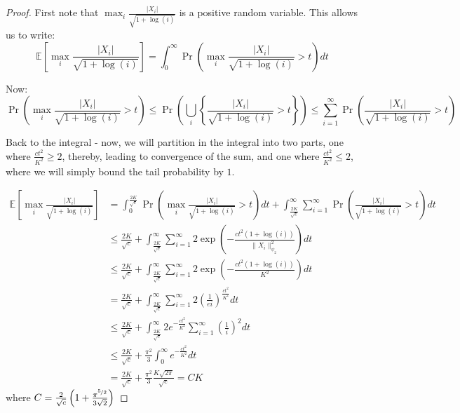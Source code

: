 \documentclass{article}
\theoremstyle{remark}
\newcommand{\Exp}{\mathbb{E}}
\begin{document}
\begin{proof}
First note that \(\max_{i} \frac{|X_{i}|}{\sqrt{1 + \log(i)}}\) is a positive random variable. This allows us to write:
\begin{equation*}
\Exp\left[\max_{i} \frac{|X_{i}|}{\sqrt{1 + \log(i)}}\right] = \int_{0}^{\infty} \Pr\left(\max_{i} \frac{|X_{i}|}{\sqrt{1 + \log(i)}} > t\right) dt
\end{equation*}

Now:
\begin{equation*}
\Pr\left(\max_{i} \frac{|X_{i}|}{\sqrt{1 + \log(i)}} > t\right) \leq \Pr\left(\bigcup_{i} \left\{\frac{|X_{i}|}{\sqrt{1 + \log(i)}} > t\right\}\right) \leq \sum_{i=1}^{\infty} \Pr\left(\frac{|X_{i}|}{\sqrt{1 + \log(i)}} > t\right)
\end{equation*}

Back to the integral - now, we will partition in the integral into two parts, one where \(\frac{ct^{2}}{K^{2}} \geq 2\), thereby, leading to convergence of the sum, and one where \(\frac{ct^{2}}{K^{2}} \leq 2\), where we will simply bound the tail probability by \(1\).

\begin{align*}
\Exp\left[\max_{i} \frac{|X_{i}|}{\sqrt{1 + \log(i)}}\right] &= \int_{0}^{\frac{2K}{\sqrt{c}}} \Pr\left(\max_{i} \frac{|X_{i}|}{\sqrt{1 + \log(i)}} > t\right) dt + \int_{\frac{2K}{\sqrt{c}}}^{\infty} \sum_{i=1}^{\infty} \Pr\left(\frac{|X_{i}|}{\sqrt{1 + \log(i)}} > t\right) dt \\
&\leq \frac{2K}{\sqrt{c}} + \int_{\frac{2K}{\sqrt{c}}}^{\infty} \sum_{i=1}^{\infty} 2\exp\left(-\frac{ct^{2}(1 + \log(i))}{\|X_{i}\|^{2}_{\psi_{2}}}\right) dt \\
&\leq \frac{2K}{\sqrt{c}} + \int_{\frac{2K}{\sqrt{c}}}^{\infty} \sum_{i=1}^{\infty} 2\exp\left(-\frac{ct^{2}(1 + \log(i))}{K^{2}}\right) dt \\
&= \frac{2K}{\sqrt{c}} + \int_{\frac{2K}{\sqrt{c}}}^{\infty} \sum_{i=1}^{\infty} 2\left(\frac{1}{ei}\right)^{\frac{ct^{2}}{K^{2}}} dt \\
&\leq \frac{2K}{\sqrt{c}} + \int_{\frac{2K}{\sqrt{c}}}^{\infty} 2e^{-\frac{ct^{2}}{K^{2}}} \sum_{i=1}^{\infty} \left(\frac{1}{i}\right)^{2} dt \\
&\leq \frac{2K}{\sqrt{c}} + \frac{\pi^{2}}{3}\int_{0}^{\infty} e^{-\frac{ct^{2}}{K^{2}}} dt \\
&= \frac{2K}{\sqrt{c}} + \frac{\pi^{2}}{3}\frac{K\sqrt{2\pi}}{\sqrt{c}} = CK
\end{align*}
where \(C = \frac{2}{\sqrt{c}}\left(1 + \frac{\pi^{\nicefrac{5}{2}}}{3\sqrt{2}}\right)\)
\end{proof}
\end{document}
